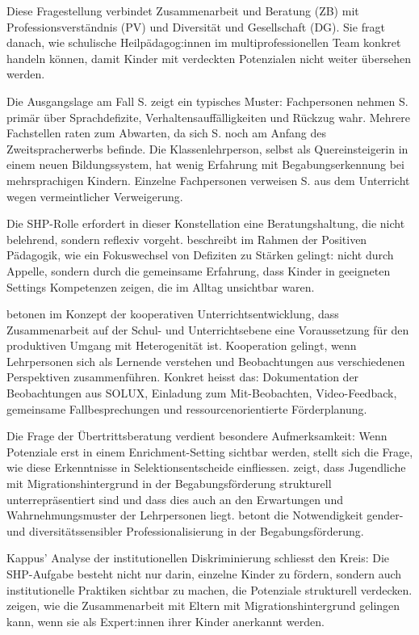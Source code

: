 \documentclass[ngerman, a4paper]{article}
\begin{document}
Diese Fragestellung verbindet Zusammenarbeit und Beratung (ZB) mit
Professionsverständnis (PV) und Diversität und Gesellschaft (DG). Sie fragt danach,
wie schulische Heilpädagog:innen im multiprofessionellen Team konkret handeln können,
damit Kinder mit verdeckten Potenzialen nicht weiter übersehen werden.
 
Die Ausgangslage am Fall S. zeigt ein typisches Muster: Fachpersonen nehmen S. primär
über Sprachdefizite, Verhaltensauffälligkeiten und Rückzug wahr. Mehrere Fachstellen
raten zum Abwarten, da sich S. noch am Anfang des Zweitspracherwerbs befinde. Die
Klassenlehrperson, selbst als Quereinsteigerin in einem neuen Bildungssystem, hat
wenig Erfahrung mit Begabungserkennung bei mehrsprachigen Kindern. Einzelne
Fachpersonen verweisen S. aus dem Unterricht wegen vermeintlicher Verweigerung.
 
Die SHP-Rolle erfordert in dieser Konstellation eine Beratungshaltung, die nicht
belehrend, sondern reflexiv vorgeht. \textcite{burow2021positive} beschreibt im Rahmen der Positiven
Pädagogik, wie ein Fokuswechsel von Defiziten zu Stärken gelingt: nicht durch
Appelle, sondern durch die gemeinsame Erfahrung, dass Kinder in geeigneten Settings
Kompetenzen zeigen, die im Alltag unsichtbar waren.
 
\textcite{buholzer2010allegleich} betonen im Konzept der kooperativen Unterrichtsentwicklung,
dass Zusammenarbeit auf der Schul- und Unterrichtsebene eine Voraussetzung
für den produktiven Umgang mit Heterogenität ist. Kooperation gelingt, wenn
Lehrpersonen sich als Lernende verstehen und Beobachtungen aus verschiedenen
Perspektiven zusammenführen. Konkret heisst das:
Dokumentation der Beobachtungen aus SOLUX, Einladung zum Mit-Beobachten,
Video-Feedback, gemeinsame Fallbesprechungen und ressourcenorientierte Förderplanung.
 
Die Frage der Übertrittsberatung verdient besondere Aufmerksamkeit: Wenn Potenziale
erst in einem Enrichment-Setting sichtbar werden, stellt sich die Frage, wie diese
Erkenntnisse in Selektionsentscheide einfliessen. \textcite[S.\,7--9,\,143--184]{leikhof2021jugendliche} zeigt, dass Jugendliche mit
Migrationshintergrund in der Begabungsförderung strukturell unterrepräsentiert sind
und dass dies auch an den Erwartungen und Wahrnehmungsmuster der Lehrpersonen
liegt. \textcite[S.\,161,\,163\psq]{macha2019gender} betont die Notwendigkeit gender- und
diversitätssensibler Professionalisierung in der Begabungsförderung.
 
Kappus' Analyse der institutionellen Diskriminierung schliesst den Kreis: Die
SHP-Aufgabe besteht nicht nur darin, einzelne Kinder zu fördern, sondern auch
institutionelle Praktiken sichtbar zu machen, die Potenziale strukturell verdecken.
\textcite{kosoroklabhart2021voneltern} zeigen, wie die Zusammenarbeit mit Eltern mit
Migrationshintergrund gelingen kann, wenn sie als Expert:innen ihrer Kinder
anerkannt werden.
\end{document}
